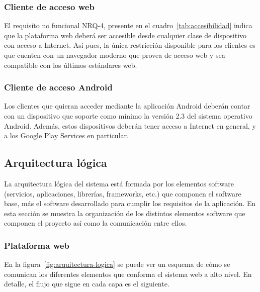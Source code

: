 \subsubsection{Cliente de acceso web}

El requisito no funcional NRQ-4, presente en el cuadro~\ref{tab:accesibilidad}
indica que la plataforma web deberá ser accesible desde cualquier clase de
dispositivo con acceso a Internet. Así pues, la única restricción disponible
para los clientes es que cuenten con un navegador moderno que provea de acceso
web y sea compatible con los últimos estándares web.

\subsubsection{Cliente de acceso Android}

Los clientes que quieran acceder mediante la aplicación Android deberán contar
con un dispositivo que soporte como mínimo la versión 2.3 del sistema operativo
Android. Además, estos dispositivos deberán tener acceso a Internet en general,
y a los Google Play Services en particular.

\subsection{Arquitectura lógica}

La arquitectura lógica del sistema está formada por los elementos software
(servicios, aplicaciones, librerías, frameworks, etc.) que componen el software
base, más el software desarrollado para cumplir los requisitos de la
aplicación. En esta sección se muestra la organización de los distintos
elementos software que componen el proyecto así como la comunicación entre
ellos. 

\subsubsection{Plataforma web}
\label{subsec:arquitectura-logica-web}

En la figura~\ref{fig:arquitectura-logica} se puede ver un esquema de cómo se
comunican los diferentes elementos que conforma el sistema web a alto nivel. En
detalle, el flujo que sigue en cada capa es el siguiente.

